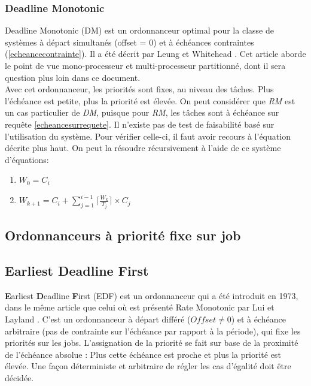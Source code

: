 \documentclass[11pt,a4paper,oneside]{report}
\begin{document}
\subsubsection{Deadline Monotonic}
Deadline Monotonic (DM) est un ordonnanceur optimal pour la classe de systèmes à départ 
simultanés (offset = 0) et à échéances contraintes
(\ref{echeancecontrainte}). 
Il a été décrit par Leung et Whitehead 
\cite{leung_complexity_1982}. Cet article aborde le point de vue mono-processeur et multi-processeur partitionné, 
dont il sera question plus loin dans ce document.\\

Avec cet ordonnanceur, les priorités sont fixes, au niveau des tâches.
Plus l'échéance est petite, plus la priorité est élevée. On peut considérer que \textit{RM} est 
un cas particulier de \textit{DM}, puisque pour \textit{RM}, les tâches sont à échéance sur requête \ref{echeancesurrequete}.
Il n'existe pas de test de faisabilité basé sur l'utilisation du système. Pour vérifier celle-ci, 
il faut avoir recours à l'équation décrite plus haut. 
On peut la résoudre récursivement à l'aide de ce système d'équations: \\
\begin{enumerate}
	\item $W_0 = C_i $
	\item $W_{k+1} = C_i + \sum_{j = 1}^{i-1}\lceil \frac{W_k}{T_j} \rceil \times C_j $
\end{enumerate}


\subsection{Ordonnanceurs à priorité fixe sur job}
\subsection{Earliest Deadline First}
\textbf{E}arliest \textbf{D}eadline \textbf{F}irst (EDF) est un ordonnanceur 
qui a été introduit en 1973, dans le même article que celui où est présenté Rate Monotonic 
par Lui et Layland \cite{liu_scheduling_1973}. C'est un ordonnanceur à départ différé ($Offset \neq 0$) 
et à échéance arbitraire (pas de contrainte sur l'échéance par rapport à la période), 
qui fixe les priorités sur les jobs. L'assignation de la priorité se fait sur base de 
la proximité de l'échéance absolue : Plus cette échéance est proche et plus la priorité est élevée. 
Une façon déterministe et arbitraire de régler les cas d'égalité doit être décidée.\\
\end{document}
